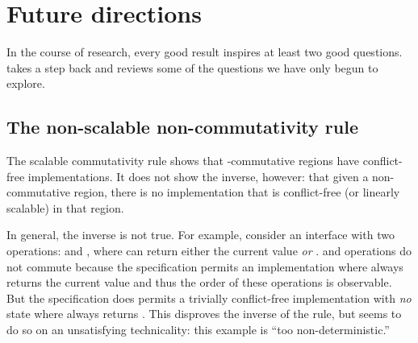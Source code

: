 \section{Future directions}
\label{sec:future-work}





In the course of research, every good result inspires at least two good
questions.
%
 takes a step back and reviews some of the
questions we have only begun to explore.



\subsection{The non-scalable non-commutativity rule}


The scalable commutativity rule shows that \SIM-commutative regions
have conflict-free implementations.
%
It does not show the inverse, however: that given a non-commutative
region, there is no implementation that is conflict-free (or linearly
scalable) in that region.

In general, the inverse is not true.
%
For example, consider an interface with two operations:
 and , where  can return either
the current value \emph{or} .   and
 operations do not \SIM commute because the specification
permits an implementation where  always returns the current
value and thus the order of these operations is observable.  But the
specification does permits a trivially conflict-free implementation
with \emph{no} state where  always returns .
%
This disproves the inverse of the rule, but seems to do so on an
unsatisfying technicality: this example is ``too non-deterministic.''
%

